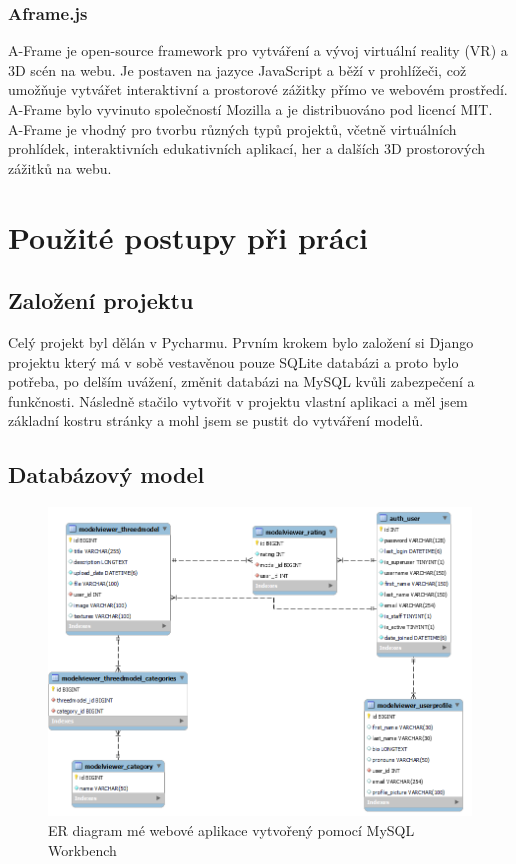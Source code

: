 \documentclass[12pt, a4paper,
twoside,        %
openright
]{report}
\begin{document}
	\subsection[Aframe.js]{Aframe.js}
	A-Frame je open-source framework pro vytváření a vývoj virtuální reality (VR) a 3D scén na webu. Je postaven na jazyce JavaScript a běží v prohlížeči, což umožňuje vytvářet interaktivní a prostorové zážitky přímo ve webovém prostředí. A-Frame bylo vyvinuto společností Mozilla a je distribuováno pod licencí MIT.
A-Frame je vhodný pro tvorbu různých typů projektů, včetně virtuálních prohlídek, interaktivních edukativních aplikací, her a dalších 3D prostorových zážitků na webu.
	\chapter{Použité postupy při práci}
	\section[Založení projektu]{Založení projektu}
	Celý projekt byl dělán v Pycharmu. Prvním krokem bylo založení si Django projektu který má v sobě vestavěnou pouze SQLite databázi a proto bylo potřeba, po delším uvážení, změnit databázi na MySQL kvůli zabezpečení a funkčnosti. Následně stačilo vytvořit v projektu vlastní aplikaci a měl jsem základní kostru stránky a mohl jsem se pustit do vytváření modelů.
	\section[Databázový model]{Databázový model}
		\begin{figure}[h]
			\centering
			\includegraphics[width=0.9\linewidth]{image/mvt-model.png} 
			\caption{ER diagram mé webové aplikace vytvořený pomocí MySQL Workbench}
		\end{figure}
		\clearpage
\end{document}
